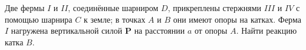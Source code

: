 Две фермы $I$ и $II$, соединённые шарниром $D$, прикреплены стержнями
$III$ и $IV$ с помощью шарнира $C$ к земле;
в точках $A$ и $B$ они имеют опоры на катках.
Ферма $I$ нагружена вертикальной силой $\boldsymbol{P}$
на расстоянии $a$ от опоры $A$.
Найти реакцию катка $B$.

